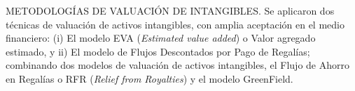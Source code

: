 \begin{leftcolumn}

\textcolor{secundario}{METODOLOG\'IAS DE VALUACI\'ON DE  INTANGIBLES}. Se aplicaron \textcolor{secundario}{dos t\'ecnicas de valuaci\'on de activos intangibles}, con amplia aceptaci\'on en el medio financiero: \textcolor{principal}{(i) El modelo EVA} (\textit{Estimated value added}) o Valor agregado estimado, y \textcolor{principal}{ii) El modelo de Flujos Descontados por Pago de Regalías}; combinando dos modelos de valuación de activos intangibles, el Flujo de Ahorro en Regalías o RFR (\textit{Relief from Royalties}) y el modelo  GreenField. \\

\end{leftcolumn}


